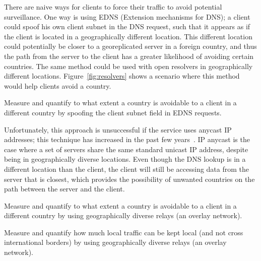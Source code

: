There are naive ways for clients to force their traffic to avoid potential surveillance.  One way is using EDNS (Extension mechanisms for DNS); a client could spoof his own client subnet in the DNS request, such that it appears as if the client is located in a geographically different location.  This different location could potentially be closer to a georeplicated server in a foreign country, and thus the path from the server to the client has a greater likelihood of avoiding certain countries.  The same method could be used with open resolvers in geographically different locations.  Figure~\ref{fig:resolvers} shows a scenario where this method would help clients avoid a country.  

\begin{thm}
Measure and quantify to what extent a country is avoidable to a client in a different country by spoofing the client subnet field in EDNS requests.
\end{thm}

Unfortunately, this approach is unsuccessful if the service uses anycast IP addresses; this technique has increased in the past few years~\cite{cicalese2015characterizing}.  IP anycast is the case where a set of servers share the same standard unicast IP address, despite being in geographically diverse locations.  Even though the DNS lookup is in a different location than the client, the client will still be accessing data from the server that is closest, which provides the possibility of unwanted countries on the path between the server and the client.  


\begin{thm}
Measure and quantify to what extent a country is avoidable to a client in a different country by using geographically diverse relays (an overlay network).
\end{thm}

\begin{thm}
Measure and quantify how much local traffic can be kept local (and not cross international borders) by using geographically diverse relays (an overlay network).
\end{thm}
